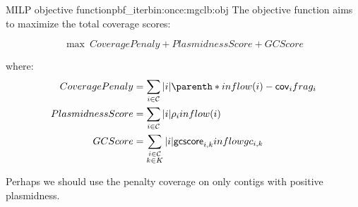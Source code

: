 \begin{definition}{\MGCLB{} MILP objective function}{pbf_iterbin:once:mgclb:obj}
  The objective function aims to maximize the total coverage scores:
  \begin{Objective}
    \begin{equation}
      \max ~ CoveragePenaly + PlasmidnessScore + GCScore
      \label{pbf_iterbin:once:mgclb:obj:max_coverage_score} %
    \end{equation}
  \end{Objective}
  where:
  \begin{align*}
    CoveragePenaly &= %
    \sum_{i \in \Contigs{}} |i| \parenth*{ inflow(i) - \cov{i}\frag{i} } \\
    PlasmidnessScore &= %
    \sum_{i \in \Contigs{}} |i| \plm{i} inflow(i) \\
    GCScore &= %
    \sum_{\substack{
        i \in \Contigs{} \\
        k \in K
    }} |i| \gcscore{i}{k} \inflowgc{i}{k}
  \end{align*}

  \begin{ideabox}
    Perhaps we should use the penalty coverage on only contigs with positive plasmidness.
  \end{ideabox}
\end{definition}